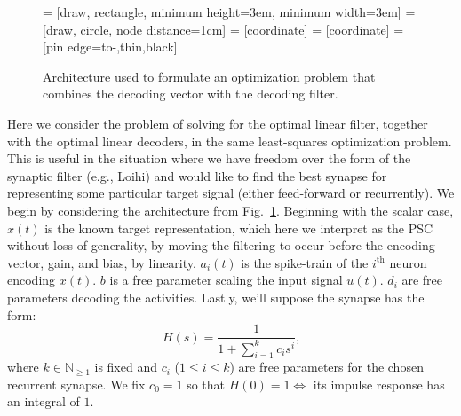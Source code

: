 \begin{figure}
\centering
{} = [draw, rectangle, minimum height=3em, minimum width=3em]
 = [draw, circle, node distance=1cm]
 = [coordinate]
 = [coordinate]
 = [pin edge={to-,thin,black}]
\caption{\label{fig:decoding-filter} Architecture used to formulate an optimization problem that combines the decoding vector with the decoding filter.}
\end{figure}

Here we consider the problem of solving for the optimal linear filter, together with the optimal linear decoders, in the same least-squares optimization problem.
This is useful in the situation where we have freedom over the form of the synaptic filter (e.g., Loihi) and would like to find the best synapse for representing some particular target signal (either feed-forward or recurrently).
We begin by considering the architecture from Fig.~\ref{fig:decoding-filter}.
Beginning with the scalar case, ${x}(t)$ is the known target representation, which here we interpret as the PSC without loss of generality, by moving the filtering to occur before the encoding vector, gain, and bias, by linearity.
$a_i(t)$ is the spike-train of the $i^\text{th}$ neuron encoding ${x}(t)$. ${b}$ is a free parameter scaling the input signal ${u}(t)$. ${d}_i$ are free parameters decoding the activities. Lastly, we'll suppose the synapse has the form:
\begin{equation}
H(s) = \frac{1}{1 + \sum_{i=1}^k c_i s^i} \text{,}
\end{equation}
where $k \in \mathbb{N}_{\ge 1}$ is fixed and $c_i$ ($1 \le i \le k$) are free parameters for the chosen recurrent synapse.
We fix $c_0 = 1$ so that $H(0) = 1 \iff$ its impulse response has an integral of $1$.

